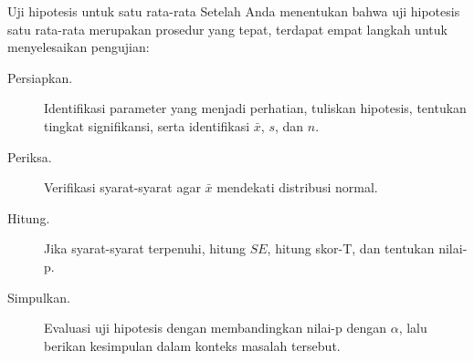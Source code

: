 \begin{onebox}{Uji hipotesis untuk satu rata-rata}
  Setelah Anda menentukan bahwa uji hipotesis satu rata-rata merupakan
  prosedur yang tepat, terdapat empat langkah untuk menyelesaikan
  pengujian:
  \begin{description}
  \item[Persiapkan.]
      Identifikasi parameter yang menjadi perhatian,
      tuliskan hipotesis,
      tentukan tingkat signifikansi,
      serta identifikasi $\bar{x}$, $s$, dan $n$.
  \item[Periksa.]
      Verifikasi syarat-syarat agar $\bar{x}$ mendekati distribusi normal.
  \item[Hitung.]
      Jika syarat-syarat terpenuhi, hitung $SE$,
      hitung skor-T, dan tentukan nilai-p.
  \item[Simpulkan.]
      Evaluasi uji hipotesis dengan membandingkan nilai-p
      dengan $\alpha$, lalu berikan kesimpulan dalam konteks
      masalah tersebut.
  \end{description}
\end{onebox}



{}
